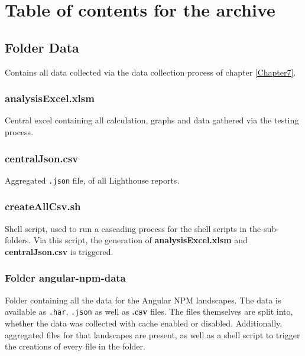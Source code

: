 
\chapter{Table of contents for the archive} %

\label{appendix1} %


\section{Folder Data}

Contains all data collected via the data collection process of chapter \ref{Chapter7}.

\subsection{analysisExcel.xlsm}

Central excel containing all calculation, graphs and data gathered via the testing process. 

\subsection{centralJson.csv}

Aggregated \texttt{.json} file, of all Lighthouse reports. 

\subsection{createAllCsv.sh}

Shell script, used to run a cascading process for the shell scripts in the sub-folders. 
Via this script, the generation of \textbf{analysisExcel.xlsm} and \textbf{centralJson.csv} is triggered.
 
\subsection{Folder angular-npm-data}

Folder containing all the data for the Angular NPM landscapes. 
The data is available as \texttt{.har}, \texttt{.json} as well as \textbf{.csv} files. 
The files themselves are split into, whether the data was collected with cache enabled or disabled.
Additionally, aggregated files for that landscapes are present, as well as a shell script to trigger the creations of every file in the folder.

